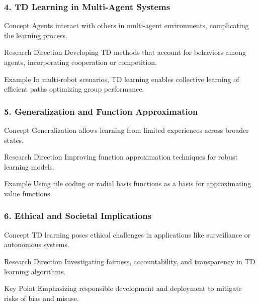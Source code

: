 \documentclass[aspectratio=169]{beamer}
\begin{document}
\begin{frame}[fragile]
    \frametitle{4. TD Learning in Multi-Agent Systems}
    \begin{block}{Concept}
        Agents interact with others in multi-agent environments, complicating the learning process.
    \end{block}
    \begin{block}{Research Direction}
        Developing TD methods that account for behaviors among agents, incorporating cooperation or competition.
    \end{block}
    \begin{block}{Example}
        In multi-robot scenarios, TD learning enables collective learning of efficient paths optimizing group performance.
    \end{block}
\end{frame}

\begin{frame}[fragile]
    \frametitle{5. Generalization and Function Approximation}
    \begin{block}{Concept}
        Generalization allows learning from limited experiences across broader states.
    \end{block}
    \begin{block}{Research Direction}
        Improving function approximation techniques for robust learning models.
    \end{block}
    \begin{block}{Example}
        Using tile coding or radial basis functions as a basis for approximating value functions.
    \end{block}
\end{frame}

\begin{frame}[fragile]
    \frametitle{6. Ethical and Societal Implications}
    \begin{block}{Concept}
        TD learning poses ethical challenges in applications like surveillance or autonomous systems.
    \end{block}
    \begin{block}{Research Direction}
        Investigating fairness, accountability, and transparency in TD learning algorithms.
    \end{block}
    \begin{block}{Key Point}
        Emphasizing responsible development and deployment to mitigate risks of bias and misuse.
    \end{block}
\end{frame}
\end{document}
